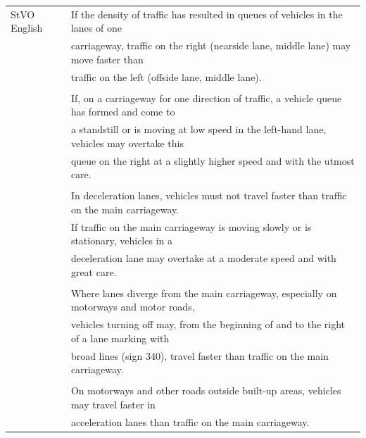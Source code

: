\begin{table}[H]
\begin{tabular}[t]{ll}
		StVO English & If the density of traffic has resulted in queues of vehicles in the lanes of one \\
		& carriageway, traffic on the right (nearside lane, middle lane) may move faster than \\
		& traffic on the left (offside lane, middle lane).\\
		& \\
		& If, on a carriageway for one direction of traffic, a vehicle queue has formed and come to \\ 
		& a standstill or is moving at low speed in the left-hand lane, vehicles may overtake this \\ 
		& queue on the right at a slightly higher speed and with the utmost care. \\
		& \\
		& In deceleration lanes, vehicles must not travel faster than traffic on the main carriageway. \\
		& If traffic on the main carriageway is moving slowly or is stationary, vehicles in a \\
		& deceleration lane may overtake at a moderate speed and with great care. \\
		& \\
		& Where lanes diverge from the main carriageway, especially on motorways and motor roads, \\
		& vehicles turning off may, from the beginning of and to the right of a lane marking with \\
		& broad lines (sign 340), travel faster than traffic on the main carriageway. \\
		& \\
		& On motorways and other roads outside built-up areas, vehicles may travel faster in \\
		& acceleration lanes than traffic on the main carriageway. \\
	\end{tabular}
\end{table}

